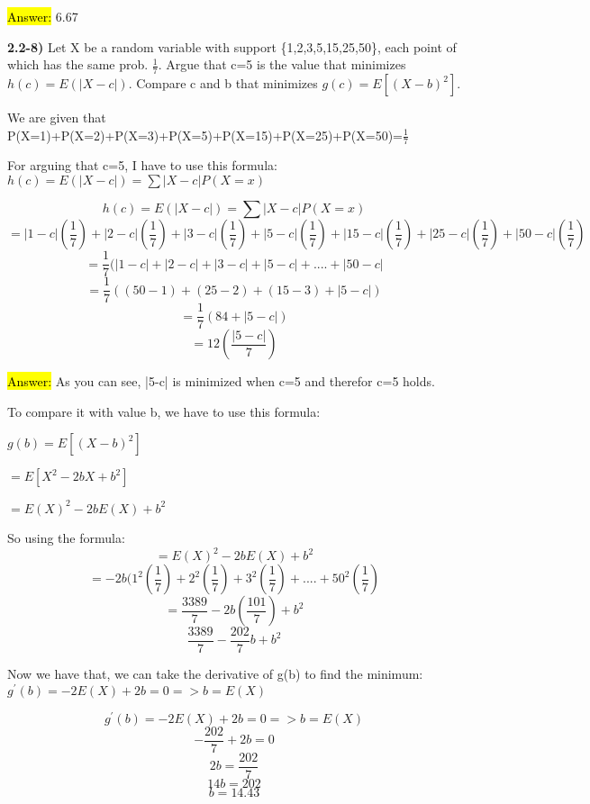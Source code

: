 \documentclass{article}
\begin{document}
\hl{Answer:} 6.67

\newpage
\textbf{2.2-8)} Let X be a random variable with support \{1,2,3,5,15,25,50\}, each point of which has the same prob. $\frac{1}{7}$. Argue that c=5 is the value that minimizes $h(c)=E(|X-c|)$. Compare c and b that minimizes $g(c)=E[(X-b)^{2}]$.

We are given that P(X=1)+P(X=2)+P(X=3)+P(X=5)+P(X=15)+P(X=25)+P(X=50)=$\frac{1}{7}$

For arguing that c=5, I have to use this formula: $h(c)=E(|X-c|)=\sum |X-c| P(X=x)$ 

$$h(c)=E(|X-c|)=\sum |X-c| P(X=x)$$
$$=|1-c|(\frac{1}{7})+|2-c|(\frac{1}{7})+|3-c|(\frac{1}{7})+|5-c|(\frac{1}{7})+|15-c|(\frac{1}{7})+|25-c|(\frac{1}{7})+|50-c|(\frac{1}{7})$$
$$=\frac{1}{7}(|1-c|+|2-c|+|3-c|+|5-c|+....+|50-c|$$
$$=\frac{1}{7}((50-1)+(25-2)+(15-3)+|5-c|)$$
$$=\frac{1}{7}(84+|5-c|)$$
$$=12(\frac{|5-c|}{7})$$

\hl{Answer:} As you can see, |5-c| is minimized when c=5 and therefor c=5 holds.

\vspace{2mm}

To compare it with value b, we have to use this formula:
\vspace{2mm}

 $g(b)=E[(X-b)^{2}]$
 
 \vspace{2mm}
 
 $=E[X^{2}-2bX+b^{2}]$
 
 \vspace{2mm}
 
 $=E(X)^{2}-2bE(X)+b^{2}$
 
 \vspace{2mm}
 
  So using the formula:
 $$=E(X)^{2}-2bE(X)+b^{2}$$
 $$=-2b(1^{2}(\frac{1}{7})+2^{2}(\frac{1}{7})+3^{2}(\frac{1}{7})+....+50^{2}(\frac{1}{7})$$
 $$=\frac{3389}{7}-2b(\frac{101}{7})+b^{2}$$
 $$\frac{3389}{7}-\frac{202}{7}b+b^{2}$$
 
 Now we have that, we can take the derivative of g(b) to find the minimum: $g^{'}(b)=-2E(X)+2b=0 => b=E(X)$
 
$$g^{'}(b)=-2E(X)+2b=0 => b=E(X)$$
$$-\frac{202}{7}+2b=0$$
$$2b=\frac{202}{7}$$
$$14b=202$$
$$b=14.43$$

\vspace{2mm}
\end{document}
